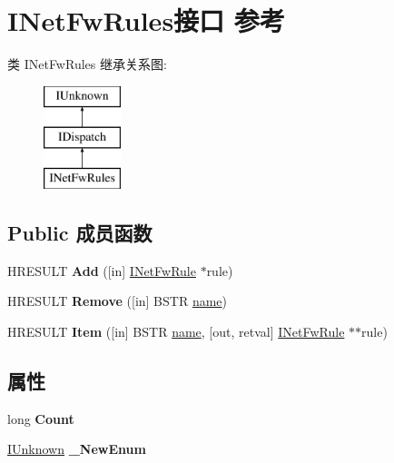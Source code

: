 \hypertarget{interface_i_net_fw_rules}{}\section{I\+Net\+Fw\+Rules接口 参考}
\label{interface_i_net_fw_rules}
类 I\+Net\+Fw\+Rules 继承关系图\+:\begin{figure}[H]
\begin{center}
\leavevmode
\includegraphics[height=3.000000cm]{interface_i_net_fw_rules}
\end{center}
\end{figure}
\subsection*{Public 成员函数}
\begin{DoxyCompactItemize}
\item 
\mbox{\label{interface_i_net_fw_rules_adc10ca1b84a019896676864a20a43024}} 
H\+R\+E\+S\+U\+LT {\bfseries Add} (\mbox{[}in\mbox{]} \hyperlink{interface_i_net_fw_rule}{I\+Net\+Fw\+Rule} $\ast$rule)
\item 
\mbox{\label{interface_i_net_fw_rules_ae30e6c2be48fd50137cbfeb1215785e1}} 
H\+R\+E\+S\+U\+LT {\bfseries Remove} (\mbox{[}in\mbox{]} B\+S\+TR \hyperlink{structname}{name})
\item 
\mbox{\label{interface_i_net_fw_rules_aa723d314d678375a68a5ce3e1673aa67}} 
H\+R\+E\+S\+U\+LT {\bfseries Item} (\mbox{[}in\mbox{]} B\+S\+TR \hyperlink{structname}{name}, \mbox{[}out, retval\mbox{]} \hyperlink{interface_i_net_fw_rule}{I\+Net\+Fw\+Rule} $\ast$$\ast$rule)
\end{DoxyCompactItemize}
\subsection*{属性}
\begin{DoxyCompactItemize}
\item 
\mbox{\label{interface_i_net_fw_rules_ad01d64599ed0e4ea9b128f1ae4e49744}} 
long {\bfseries Count}
\item 
\mbox{\label{interface_i_net_fw_rules_a8d023e0dd582f22ee33735f9de9ed9ce}} 
\hyperlink{interface_i_unknown}{I\+Unknown} {\bfseries \+\_\+\+New\+Enum}
\end{DoxyCompactItemize}
